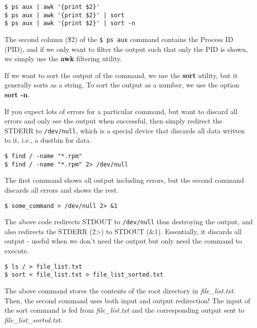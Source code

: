 \noindent
\begin{verbatim}	
$ ps aux | awk '{print $2}'
$ ps aux | awk '{print $2}' | sort
$ ps aux | awk '{print $2}' | sort -n
\end{verbatim}

\noindent
The second column (\$2) of the \verb|$ ps aux| command contains the Process ID (PID), and if we only want to filter the output such that only the PID is shown, we simply use the \textbf{awk} filtering utility. 

If we want to sort the output of the command, we use the \textbf{sort} utility, but it generally sorts as a string. To sort the output as a number, we use the option \textbf{sort -n}.

\noindent
If you expect lots of errors for a particular command, but want to discard all errors and only see the output when successful, then simply redirect the STDERR to \verb|/dev/null|, which is a special device that discards all data written to it, i.e., a dustbin for data. 

\begin{verbatim}	
$ find / -name "*.rpm"
$ find / -name "*.rpm" 2> /dev/null
\end{verbatim}

\noindent
The first command shows all output including errors, but the second command discards all errors and shows the rest. 	

\begin{verbatim}
$ some_command > /dev/null 2> &1
\end{verbatim}

\noindent
The above code redirects STDOUT to \verb|/dev/null| thus destroying the output, and also redirects the STDERR (2>) to STDOUT (\&1). Essentially, it discards all output - useful when we don't need the output but only need the command to execute.

\begin{verbatim}
$ ls / > file_list.txt
$ sort < file_list.txt > file_list_sorted.txt
\end{verbatim}

\noindent
The above command stores the contents of the root directory in \textit{file\_list.txt}. Then, the second command uses both input and output redirection! The input of the sort command is fed from \textit{file\_list.txt} and the corresponding output sent to \textit{file\_list\_sorted.txt}.